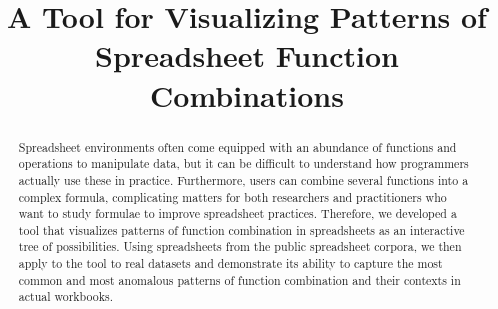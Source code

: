 \documentclass[conference]{IEEEtran}
\begin{document}
 \title{A Tool for Visualizing Patterns of Spreadsheet Function
		Combinations}
	
	
	\author{ }
	
	
	
	
	
	
	\maketitle
	
	\begin{abstract} Spreadsheet environments often come equipped with an abundance
		of functions and operations to manipulate data, but it can be difficult to
		understand how programmers actually use these in practice. Furthermore, users
		can combine several functions into a complex formula, complicating matters for
		both researchers and practitioners who want to study formulae to improve
		spreadsheet practices. Therefore, we developed a tool that visualizes patterns
		of function combination in spreadsheets as an interactive tree of
		possibilities. Using spreadsheets from the public spreadsheet corpora, we then
		apply to the tool to real datasets and demonstrate its ability to capture the
		most common and most anomalous patterns of function combination and their
		contexts in actual workbooks. \end{abstract}
	
\end{document}
